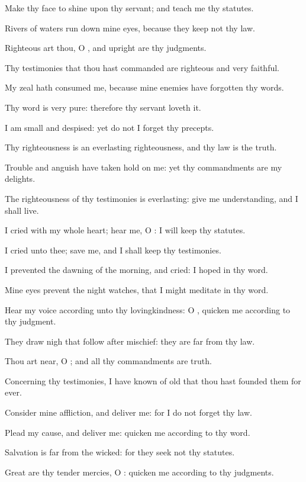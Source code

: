 \Verse Make thy face to shine upon thy servant; and teach me thy statutes.

\Verse Rivers of waters run down mine eyes, because they keep not thy law.

\Verse Righteous art thou, O \LORD, and upright are thy judgments.

\Verse Thy testimonies that thou hast commanded are righteous and very faithful.

\Verse My zeal hath consumed me, because mine enemies have forgotten thy words.

\Verse Thy word is very pure: therefore thy servant loveth it.

\Verse I am small and despised: yet do not I forget thy precepts.

\Verse Thy righteousness is an everlasting righteousness, and thy law is the truth.

\Verse Trouble and anguish have taken hold on me: yet thy commandments are my delights.

\Verse The righteousness of thy testimonies is everlasting: give me understanding, and I shall live.

\Verse I cried with my whole heart; hear me, O \LORD: I will keep thy statutes.

\Verse I cried unto thee; save me, and I shall keep thy testimonies.

\Verse I prevented the dawning of the morning, and cried: I hoped in thy word.

\Verse Mine eyes prevent the night watches, that I might meditate in thy word.

\Verse Hear my voice according unto thy lovingkindness: O \LORD, quicken me according to thy judgment.

\Verse They draw nigh that follow after mischief: they are far from thy law.

\Verse Thou art near, O \LORD; and all thy commandments are truth.

\Verse Concerning thy testimonies, I have known of old that thou hast founded them for ever.

\Verse Consider mine affliction, and deliver me: for I do not forget thy law.

\Verse Plead my cause, and deliver me: quicken me according to thy word.

\Verse Salvation is far from the wicked: for they seek not thy statutes.

\Verse Great are thy tender mercies, O \LORD: quicken me according to thy judgments.

